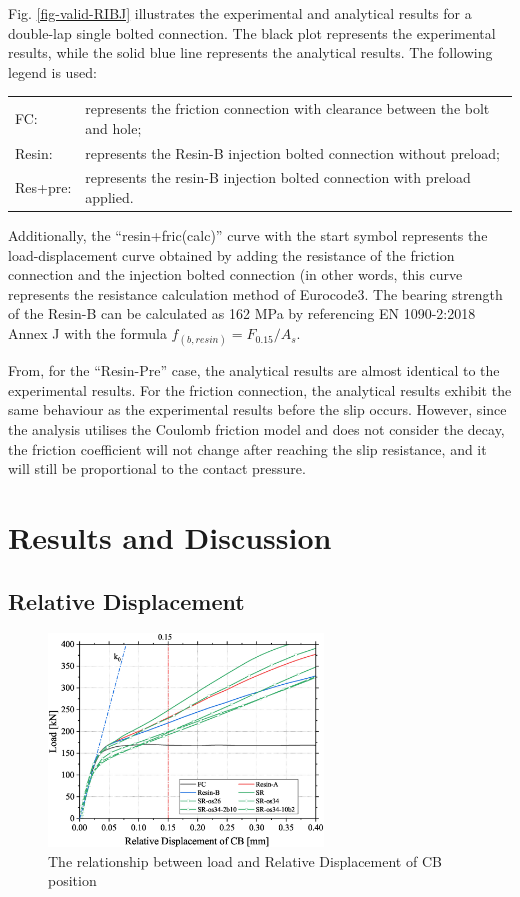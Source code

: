 Fig. \ref{fig-valid-RIBJ} illustrates the experimental and analytical results for a double-lap single bolted connection. The black plot represents the experimental results, while the solid blue line represents the analytical results. The following legend is used:

\begin{table}[h]
    \centering
    \begin{tabular}{ll}
     FC:&  represents the friction connection with clearance between the bolt and hole;  \\
     Resin: & represents the Resin-B injection bolted connection without preload; \\
     Res+pre: & represents the resin-B injection bolted connection with preload applied.
    \end{tabular}
\end{table}
 
Additionally, the “resin+fric(calc)”   curve with the start symbol represents the load-displacement curve obtained by adding the resistance of the friction connection and the injection bolted connection (in other words, this curve represents the resistance calculation method of Eurocode3. The bearing strength of the Resin-B can be calculated as 162 MPa by referencing EN 1090-2:2018 Annex J with the formula $f_{(b,resin)}=F_{0.15}/A_s$.

From, for the “Resin-Pre” case, the analytical results are almost identical to the experimental results. For the friction connection, the analytical results exhibit the same behaviour as the experimental results before the slip occurs. However, since the analysis utilises the Coulomb friction model and does not consider the decay, the friction coefficient will not change after reaching the slip resistance, and it will still be proportional to the contact pressure.

\section{Results and Discussion}

\subsection{Relative Displacement}

\begin{figure}[htbp]
    \centering
    \includegraphics[width=0.65\textwidth]{imgs/app3/RD-RIBJ.eps}
    \caption{The relationship between load and Relative Displacement of CB position}
    \label{fig-RD-RIBJ}
\end{figure}

